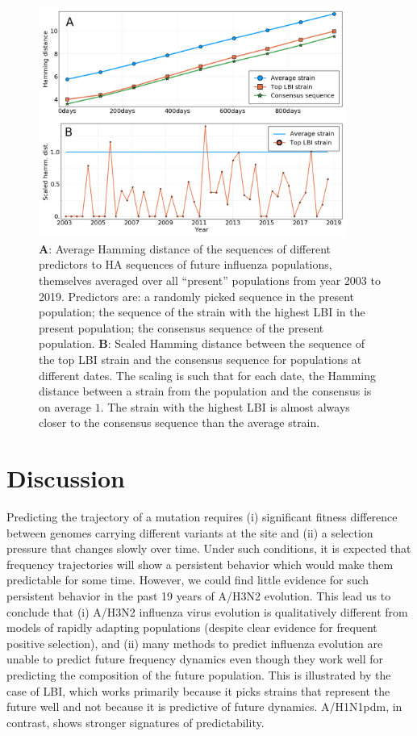 \documentclass[reprint,amsmath,amssymb,superscriptaddress,showpacs,rmp]{revtex4-1}
\begin{document}
\begin{figure}
	\centering
	\includegraphics[width=0.9\textwidth]{./Figures/Panel4.png}
	\caption{\textbf{A}: Average Hamming distance of the sequences of different predictors to HA sequences of future influenza populations, themselves averaged over all ``present'' populations from year 2003 to 2019. Predictors are: a randomly picked sequence in the present population; the sequence of the strain with the highest LBI in the present population; the consensus sequence of the present population. \textbf{B}: Scaled Hamming distance between the sequence of the top LBI strain and the consensus sequence for populations at different dates. The scaling is such that for each date, the Hamming distance between a strain from the population and the consensus is on average $1$. The strain with the highest LBI is almost always closer to the consensus sequence than the average strain.}
	\label{fig:LBI_consensus}
\end{figure}


\section*{Discussion} %
\label{sec:discussion}

Predicting the trajectory of a mutation requires (i) significant fitness difference between genomes carrying different variants at the site and (ii) a selection pressure that changes slowly over time.
Under such conditions, it is expected that frequency trajectories will show a persistent behavior which would make them predictable for some time.
However, we could find little evidence for such persistent behavior in the past 19 years of A/H3N2 evolution.
This lead us to conclude that (i) A/H3N2 influenza virus evolution is qualitatively different from models of rapidly adapting populations (despite clear evidence for frequent positive selection), and (ii) many methods to predict influenza evolution are unable to predict future frequency dynamics even though they work well for predicting the composition of the future population.
This is illustrated by the case of LBI, which works primarily because it picks strains that represent the future well and not because it is predictive of future dynamics.
A/H1N1pdm, in contrast, shows stronger signatures of predictability.
\end{document}
